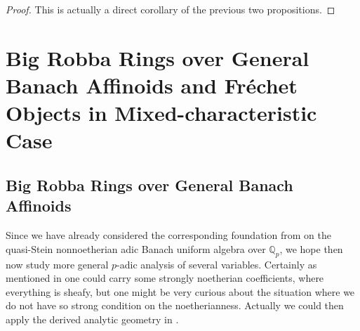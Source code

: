 \documentclass[12pt]{amsart}
\theoremstyle{definition}
\numberwithin{equation}{section}
\begin{document}
\begin{proof}
This is actually a direct corollary of the previous two propositions. 	
\end{proof}








\newpage


\section{Big Robba Rings over General Banach Affinoids and Fr\'echet Objects in Mixed-characteristic Case}


\subsection{Big Robba Rings over General Banach Affinoids}

\indent Since we have already considered the corresponding foundation from \cite{KL2} on the quasi-Stein nonnoetherian adic Banach uniform algebra over $\mathbb{Q}_p$, we hope then now study more general $p$-adic analysis of several variables. Certainly as mentioned in \cite{KPX} one could carry some strongly noetherian coefficients, where everything is sheafy, but one might be very curious about the situation where we do not have so strong condition on the noetherianness. Actually we could then apply the derived analytic geometry in \cite{BK}.
\end{document}
